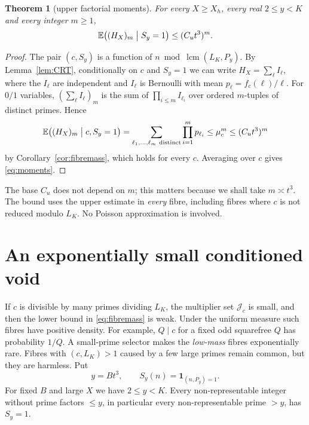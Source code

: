 \documentclass[10pt,reqno]{amsart}
\newtheorem{theorem}{Theorem}[section]
\theoremstyle{remark}
\newcommand{\J}{\mathcal J}
\newcommand{\E}{\mathbb E}
\newcommand{\ind}{\mathbf1}
\newcommand{\lcm}{\operatorname{lcm}}
\begin{document}
\begin{theorem}[upper factorial moments]\label{thm:moments}
For every $X\geq X_h$, every real $2\leq y<K$ and every integer $m\geq1$,
\begin{equation}\label{eq:moments}
 \E\bigl((H_X)_m\bigm|S_y=1\bigr)\leq(C_ut^3)^m .
\end{equation}
\end{theorem}
\begin{proof}
The pair $(c,S_y)$ is a function of $n\bmod\lcm(L_K,P_y)$.  By
Lemma~\ref{lem:CRT}, conditionally on $c$ and $S_y=1$ we can write
$H_X=\sum_\ell I_\ell$, where the $I_\ell$ are independent and $I_\ell$ is
Bernoulli with mean $p_\ell=f_c(\ell)/\ell$.  For $0/1$ variables,
$(\sum_\ell I_\ell)_m$ is the sum of $\prod_{i\leq m}I_{\ell_i}$ over ordered
$m$-tuples of distinct primes.  Hence
\[
 \E\bigl((H_X)_m\bigm|c,S_y=1\bigr)
 =\sum_{\ell_1,\ldots,\ell_m\ \mathrm{distinct}}\prod_{i=1}^mp_{\ell_i}
 \leq\mu_c^m\leq(C_ut^3)^m
\]
by Corollary~\ref{cor:fibremass}, which holds for every $c$.  Averaging
over $c$ gives \eqref{eq:moments}.
\end{proof}
The base $C_u$ does not depend on $m$; this matters because we shall take
$m\asymp t^3$.  The bound uses the upper estimate in \emph{every} fibre,
including fibres where $c$ is not reduced modulo $L_K$.  No Poisson
approximation is involved.

\section{An exponentially small conditioned void}\label{sec:void}
If $c$ is divisible by many primes dividing $L_K$, the multiplier set
$\J_c$ is small, and then the lower bound in \eqref{eq:fibremass} is weak.
Under the uniform measure such fibres have positive density.  For
example, $Q\mid c$ for a fixed odd squarefree $Q$ has probability $1/Q$.
A small-prime selector makes the \emph{low-mass} fibres exponentially rare.
Fibres with $(c,L_K)>1$ caused by a few large primes remain common, but
they are harmless.  Put
\begin{equation}\label{eq:selector}
 y=Bt^3,\qquad S_y(n)=\ind_{(n,P_y)=1}.
\end{equation}
For fixed $B$ and large $X$ we have $2\leq y<K$.  Every non-representable
integer without prime factors $\leq y$, in particular every
non-representable prime $>y$, has $S_y=1$.
\end{document}
